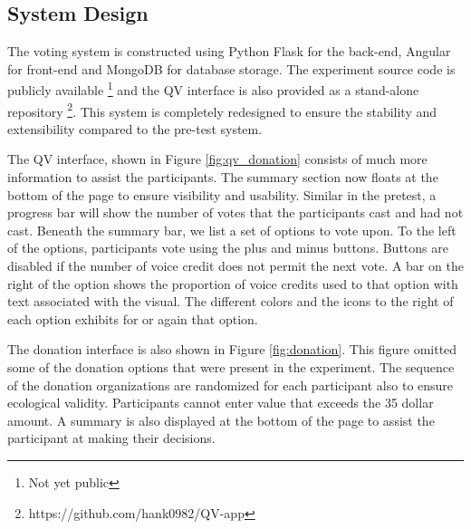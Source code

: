 \subsection{System Design}
The voting system is constructed 
using Python Flask for the back-end, 
Angular for front-end and 
MongoDB for database storage. 
The experiment source code is 
publicly available \footnote{Not yet public} 
and the QV interface is also provided 
as a stand-alone repository \footnote{https://github.com/hank0982/QV-app}.
This system is completely redesigned to ensure
the stability and extensibility
compared to the pre-test system.


The QV interface, 
shown in Figure \ref{fig:qv_donation} 
consists of much more information
to assist the participants.
The summary section 
now floats at the bottom of the page
to ensure visibility
and usability.
Similar in the pretest,
a progress bar will show the number of votes
that the participants cast 
and had not cast.
Beneath the summary bar,
we list a set of options to vote upon.
To the left of the options,
participants vote using the plus and minus buttons.
Buttons are disabled 
if the number of voice credit 
does not permit the next vote.
A bar on the right of the option 
shows the proportion of voice credits used to that option
with text associated with the visual.
The different colors and the icons to the right of each option
exhibits for or again that option.\par

The donation interface is also shown in
Figure \ref{fig:donation}. 
This figure omitted some of the donation options
that were present in the experiment.
The sequence of the donation organizations 
are randomized for each participant
also to ensure ecological validity.
Participants cannot enter value 
that exceeds the 35 dollar amount.
A summary is also displayed 
at the bottom of the page
to assist the participant
at making their decisions.\par